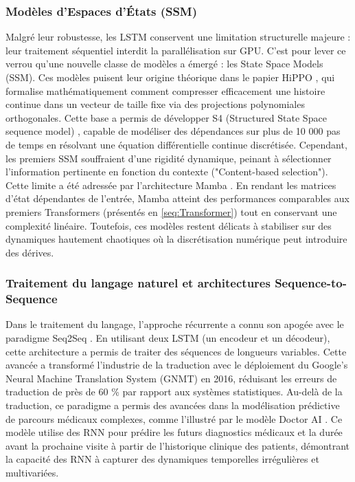 \subsubsection{Modèles d'Espaces d'États (SSM)}
Malgré leur robustesse, les LSTM conservent une limitation structurelle majeure : leur traitement séquentiel interdit la parallélisation sur GPU. C'est pour lever ce verrou qu'une nouvelle classe de modèles a émergé : les State Space Models (SSM). Ces modèles puisent leur origine théorique dans le papier HiPPO \cite{gu_hippo_2020}, qui formalise mathématiquement comment compresser efficacement une histoire continue dans un vecteur de taille fixe via des projections polynomiales orthogonales. Cette base a permis de développer S4 (Structured State Space sequence model) \cite{gu_efficiently_2022}, capable de modéliser des dépendances sur plus de 10 000 pas de temps en résolvant une équation différentielle continue discrétisée.
Cependant, les premiers SSM souffraient d'une rigidité dynamique, peinant à sélectionner l'information pertinente en fonction du contexte ("Content-based selection"). Cette limite a été adressée par l'architecture Mamba \cite{gu_mamba_2024}. En rendant les matrices d'état dépendantes de l'entrée, Mamba atteint des performances comparables aux premiers Transformers (présentés en \ref{seq:Transformer}) tout en conservant une complexité linéaire. Toutefois, ces modèles restent délicats à stabiliser sur des dynamiques hautement chaotiques où la discrétisation numérique peut introduire des dérives.

\subsubsection{Traitement du langage naturel et architectures Sequence-to-Sequence}
Dans le traitement du langage, l'approche récurrente a connu son apogée avec le paradigme Seq2Seq \cite{sutskever_sequence_2014}. En utilisant deux LSTM (un encodeur et un décodeur), cette architecture a permis de traiter des séquences de longueurs variables. Cette avancée a transformé l'industrie de la traduction avec le déploiement du Google’s Neural Machine Translation System (GNMT) \cite{wu_googles_2016} en 2016, réduisant les erreurs de traduction de près de 60 \% par rapport aux systèmes statistiques. Au-delà de la traduction, ce paradigme a permis des avancées dans la modélisation prédictive de parcours médicaux complexes, comme l'illustré par le modèle Doctor AI \cite{choi_doctor_2016}. Ce modèle utilise des RNN pour prédire les futurs diagnostics médicaux et la durée avant la prochaine visite à partir de l'historique clinique des patients, démontrant la capacité des RNN à capturer des dynamiques temporelles irrégulières et multivariées.

